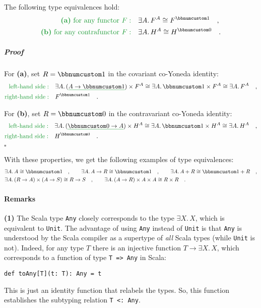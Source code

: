 The following type equivalences hold:
\begin{align*}
{\color{greenunder}\text{\textbf{(a)} for any functor }F:}\quad & \exists A.\,F^{A}\cong F^{\bbnum 1}\quad,\\
{\color{greenunder}\text{\textbf{(b)} for any contrafunctor }F:}\quad & \exists A.\,H^{A}\cong H^{\bbnum 0}\quad.
\end{align*}


\subparagraph{Proof}

For \textbf{(a)}, set $R=\bbnum 1$ in the covariant co-Yoneda identity:
\begin{align*}
{\color{greenunder}\text{left-hand side}:}\quad & \exists A.\,(\gunderline{A\rightarrow\bbnum 1})\times F^{A}\cong\exists A.\,\bbnum 1\times F^{A}\cong\exists A.\,F^{A}\quad,\\
{\color{greenunder}\text{right-hand side}:}\quad & F^{\bbnum 1}\quad.
\end{align*}

For \textbf{(b)}, set $R=\bbnum 0$ in the contravariant co-Yoneda
identity:
\begin{align*}
{\color{greenunder}\text{left-hand side}:}\quad & \exists A.\,(\gunderline{\bbnum 0\rightarrow A})\times H^{A}\cong\exists A.\,\bbnum 1\times H^{A}\cong\exists A.\,H^{A}\quad,\\
{\color{greenunder}\text{right-hand side}:}\quad & H^{\bbnum 0}\quad.
\end{align*}
 $\square$

With these properties, we get the following examples of type equivalences:
\begin{align*}
 & \exists A.\,A\cong\bbnum 1\quad,\quad\quad\exists A.\,A\rightarrow R\cong\bbnum 1\quad,\quad\quad\exists A.\,A+R\cong\bbnum 1+R\quad,\\
 & \exists A.\,(R\rightarrow A)\times(A\rightarrow S)\cong R\rightarrow S\quad,\quad\quad\exists A.\,(A\rightarrow R)\times A\times A\cong R\times R\quad.
\end{align*}


\paragraph{Remarks}

\textbf{(1)} The Scala type \lstinline!Any! closely corresponds to
the type $\exists X.\,X$, which is equivalent to \lstinline!Unit!.
The advantage of using \lstinline!Any! instead of \lstinline!Unit!
is that \lstinline!Any! is understood by the Scala compiler as a
supertype of \emph{all} Scala types (while \lstinline!Unit! is not).
Indeed, for any type $T$ there is an injective function $T\rightarrow\exists X.\,X$,
which corresponds to a function of type \lstinline!T => Any! in Scala:
\begin{lstlisting}
def toAny[T](t: T): Any = t
\end{lstlisting}
 This is just an identity function that relabels the types. So, this
function establishes the subtyping relation \lstinline!T <: Any!. 

